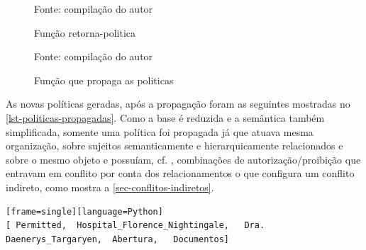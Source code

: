 \begin{figure}[!h]
	\centering
	\caption{Função retorna-politica}
	
	\label{fig:def-retorna-politica}
	{\scriptsize Fonte: compilação do autor}
\end{figure}

\begin{figure}[!h]
	\centering
	\caption{Função que propaga as politicas}
	
	\label{fig:propaga_politica}
	{\scriptsize Fonte: compilação do autor}
\end{figure}

As novas políticas geradas, após a propagação foram as seguintes mostradas no \autoref{lst-politicas-propagadas}. Como a base é reduzida e a semântica também simplificada, somente uma política foi propagada já que atuava mesma organização, sobre sujeitos semanticamente e hierarquicamente relacionados e sobre o mesmo objeto e possuíam, cf. , combinações de autorização/proibição que entravam em conflito por conta dos relacionamentos o que configura um conflito indireto, como mostra a \autoref{sec-conflitos-indiretos}.
%
\begin{lstlisting}[caption={Políticas propagadas},label=lst-politicas-propagadas][frame=single][language=Python]
[ Permitted,  Hospital_Florence_Nightingale,   Dra. Daenerys_Targaryen,  Abertura,   Documentos]
\end{lstlisting}

